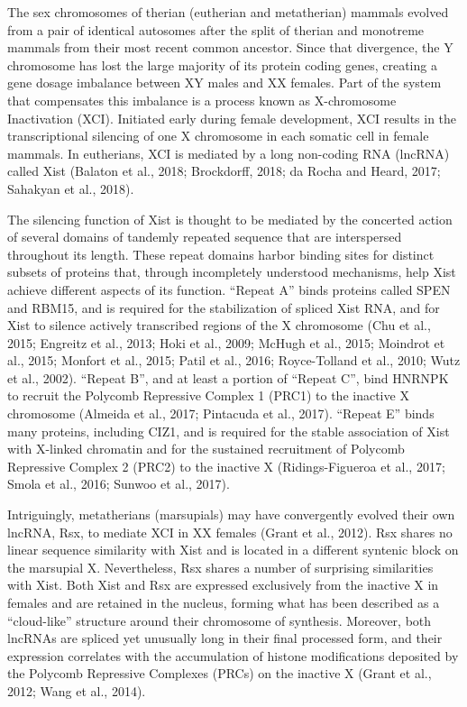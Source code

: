 The sex chromosomes of therian (eutherian and metatherian) mammals evolved from a pair of identical autosomes after the split of therian and monotreme mammals from their most recent common ancestor. Since that divergence, the Y chromosome has lost the large majority of its protein coding genes, creating a gene dosage imbalance between XY males and XX females. Part of the system that compensates this imbalance is a process known as X-chromosome Inactivation (XCI). Initiated early during female development, XCI results in the transcriptional silencing of one X chromosome in each somatic cell in female mammals. In eutherians, XCI is mediated by a long non-coding RNA (lncRNA) called Xist (Balaton et al., 2018; Brockdorff, 2018; da Rocha and Heard, 2017; Sahakyan et al., 2018). 

The silencing function of Xist is thought to be mediated by the concerted action of several domains of tandemly repeated sequence that are interspersed throughout its length. These repeat domains harbor binding sites for distinct subsets of proteins that, through incompletely understood mechanisms, help Xist achieve different aspects of its function. “Repeat A” binds proteins called SPEN and RBM15, and is required for the stabilization of spliced Xist RNA, and for Xist to silence actively transcribed regions of the X chromosome (Chu et al., 2015; Engreitz et al., 2013; Hoki et al., 2009; McHugh et al., 2015; Moindrot et al., 2015; Monfort et al., 2015; Patil et al., 2016; Royce-Tolland et al., 2010; Wutz et al., 2002). “Repeat B”, and at least a portion of “Repeat C”, bind HNRNPK to recruit the Polycomb Repressive Complex 1 (PRC1) to the inactive X chromosome (Almeida et al., 2017; Pintacuda et al., 2017). “Repeat E” binds many proteins, including CIZ1, and is required for the stable association of Xist with X-linked chromatin and for the sustained recruitment of Polycomb Repressive Complex 2 (PRC2) to the inactive X (Ridings-Figueroa et al., 2017; Smola et al., 2016; Sunwoo et al., 2017).

Intriguingly, metatherians (marsupials) may have convergently evolved their own lncRNA, Rsx, to mediate XCI in XX females (Grant et al., 2012). Rsx shares no linear sequence similarity with Xist and is located in a different syntenic block on the marsupial X. Nevertheless, Rsx shares a number of surprising similarities with Xist. Both Xist and Rsx are expressed exclusively from the inactive X in females and are retained in the nucleus, forming what has been described as a “cloud-like” structure around their chromosome of synthesis. Moreover, both lncRNAs are spliced yet unusually long in their final processed form, and their expression correlates with the accumulation of histone modifications deposited by the Polycomb Repressive Complexes (PRCs) on the inactive X (Grant et al., 2012; Wang et al., 2014). 

